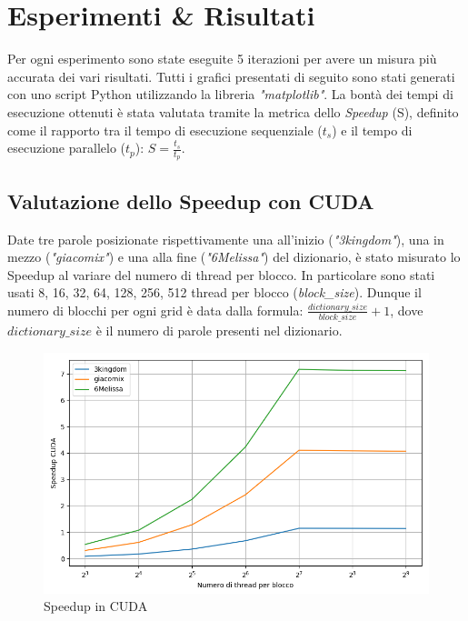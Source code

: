 \documentclass[10pt,twocolumn,letterpaper]{article}
\begin{document}
\section{Esperimenti \& Risultati}
Per ogni esperimento sono state eseguite 5 iterazioni per avere un misura più accurata dei vari risultati.\newline
Tutti i grafici presentati di seguito sono stati generati con uno script Python utilizzando la libreria \textit{"matplotlib"}.\newline
La bontà dei tempi di esecuzione ottenuti è stata valutata tramite la metrica dello \textit{Speedup} (S), definito come il rapporto tra il tempo di esecuzione sequenziale ($t_s$) e il tempo di esecuzione parallelo ($t_p$): $S = \frac{t_s}{t_p}$.

\subsection{Valutazione dello Speedup con CUDA}
Date tre parole posizionate rispettivamente una all'inizio (\textit{"3kingdom"}), una in mezzo (\textit{"giacomix"}) e una alla fine (\textit{"6Melissa"}) del dizionario, è stato misurato lo Speedup al variare del numero di thread per blocco.\newline
In particolare sono stati usati 8, 16, 32, 64, 128, 256, 512 thread per blocco (\textit{block\_size}). Dunque il numero di blocchi per ogni grid è data dalla formula: $\frac{dictionary\_size}{block\_size}+1$, dove $dictionary\_size$ è il numero di parole presenti nel dizionario.
\begin{figure}[h]
\includegraphics[width=\linewidth]{Plots/tempi_cuda.png}
\caption{Speedup in CUDA}
\end{figure}
\end{document}
